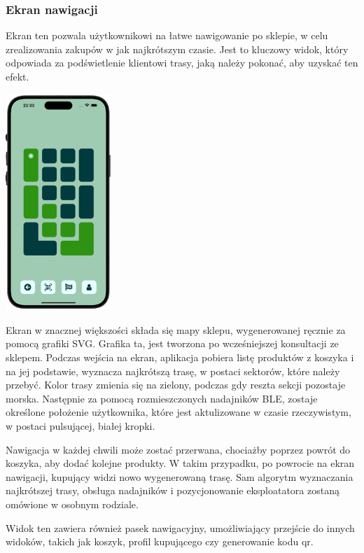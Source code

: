 \subsubsection{Ekran nawigacji}

Ekran ten pozwala użytkownikowi na łatwe nawigowanie po sklepie, w celu zrealizowania zakupów w jak najkrótszym czasie. Jest to kluczowy widok, który odpowiada za podświetlenie klientowi trasy, jaką należy pokonać, aby uzyskać ten efekt.

\begin{center}
\includegraphics[width=0.3\textwidth]{images/front/navigation_page.png}
\end{center}

Ekran w znacznej większości składa się mapy sklepu, wygenerowanej ręcznie za pomocą grafiki SVG. Grafika ta, jest tworzona po wcześniejszej konsultacji ze sklepem. Podczas wejścia na ekran, aplikacja pobiera listę produktów z koszyka i na jej podstawie, wyznacza najkrótszą trasę, w postaci sektorów, które należy przebyć. Kolor trasy zmienia się na zielony, podczas gdy reszta sekcji pozostaje morska. Następnie za pomocą rozmieszczonych nadajników BLE, zostaje określone położenie użytkownika, które jest aktulizowane w czasie rzeczywistym, w postaci pulsującej, białej kropki.

Nawigacja w każdej chwili może zostać przerwana, chociażby poprzez powrót do koszyka, aby dodać kolejne produkty. W takim przypadku, po powrocie na ekran nawigacji, kupujący widzi nowo wygenerowaną trasę. Sam algorytm wyznaczania najkrótszej trasy, obsługa nadajników i pozycjonowanie eksploatatora zostaną omówione w osobnym rodziale.

Widok ten zawiera również pasek nawigacyjny, umożliwiający przejście do innych widoków, takich jak koszyk, profil kupującego czy generowanie kodu qr.

